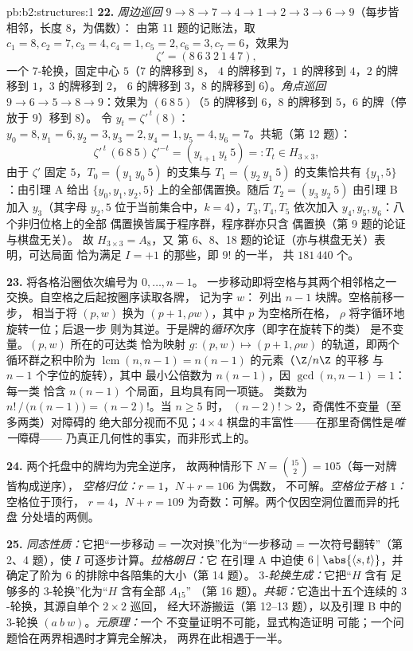 \begin{solution}{pb:b2:structures:1}
\textbf{22.} \emph{周边巡回} $9 \to 8 \to 7 \to 4 \to 1
\to 2 \to 3 \to 6 \to 9$（每步皆相邻，长度 $8$，为偶数）：
由第 11 题的记账法，取 $c_1 = 8, c_2 = 7, c_3 =
4, c_4 = 1, c_5 = 2, c_6 = 3, c_7 = 6$，效果为
\[
\zeta' = (8\ 6\ 3\ 2\ 1\ 4\ 7),
\]
一个 $7$-轮换，固定中心 $5$（$7$ 的牌移到 $8$，
$4$ 的牌移到 $7$，$1$ 的牌移到 $4$，$2$ 的牌移到 $1$，$3$ 的牌移到 $2$，
$6$ 的牌移到 $3$，$8$ 的牌移到 $6$）。\emph{角点巡回} $9 \to 6 \to
5 \to 8 \to 9$：效果为 $(6\ 8\ 5)$（$5$ 的牌移到
$6$，$8$ 的牌移到 $5$，$6$ 的牌（停放于 $9$）移到 $8$）。
令 $y_t = \zeta'^{\,t}(8)$：$y_0 = 8, y_1 = 6, y_2 = 3, y_3 = 2,
y_4 = 1, y_5 = 4, y_6 = 7$。共轭（第 12 题）：
\[
\zeta'^{\,t}\,(6\ 8\ 5)\,\zeta'^{-t}
= (y_{t+1}\ y_t\ 5) =: T_t \in H_{3\times3},
\]
由于 $\zeta'$ 固定 $5$，$T_0 = (y_1\ y_0\ 5)$ 的支集与
$T_1 = (y_2\ y_1\ 5)$ 的支集恰共有 $\{y_1, 5\}$：由引理 A
给出 $\{y_0, y_1, y_2, 5\}$ 上的全部偶置换。随后
$T_2 = (y_3\ y_2\ 5)$ 由引理 B 加入 $y_3$（其字母
$y_2, 5$ 位于当前集合中，$k = 4$），$T_3, T_4, T_5$
依次加入 $y_4, y_5, y_6$：八个非归位格上的全部
偶置换皆属于程序群，程序群亦只含
偶置换（第 9 题的论证与棋盘无关）。
故 $H_{3\times3} = A_8$，又
第 6、8、18 题的论证（亦与棋盘无关）表明，可达局面
恰为满足 $I = +1$ 的那些，即 $9!$ 的一半，
共 $181\,440$ 个。

\textbf{23.} 将各格沿圈依次编号为 $0, \dots, n-1$。
一步移动即将空格与其两个相邻格之一交换。自空格之后起按圈序读取各牌，
记为字 $w$：
列出 $n - 1$ 块牌。空格前移一步，
相当于将 $(p, w)$ 换为 $(p + 1, \rho w)$，其中 $p$ 为空格所在格，
$\rho$ 将字循环地旋转一位；后退一步
则为其逆。于是牌的\emph{循环}次序（即字在旋转下的类）
是不变量。$(p, w)$ 所在的可达类
恰为映射 $g \colon (p, w) \mapsto (p+1,
\rho w)$ 的轨道，即两个循环群之积中阶为 $\operatorname{lcm}(n, n-1) =
n(n-1)$ 的元素（$\Z/n\Z$ 的平移
与 $n-1$ 个字位的旋转），其中
最小公倍数为 $n(n-1)$，因 $\gcd(n, n-1) = 1$：每一类
恰含 $n(n-1)$ 个局面，且均具有同一项链。
类数为 $n!\,/\,\bigl(n(n-1)\bigr) = (n-2)!$。当 $n \geq 5$ 时，
$(n-2)! > 2$，奇偶性不变量（至多两类）对障碍的
绝大部分视而不见；$4
\times 4$ 棋盘的丰富性——在那里奇偶性是\emph{唯一}障碍——
乃真正几何性的事实，而非形式上的。

\textbf{24.} 两个托盘中的牌均为完全逆序，
故两种情形下 $N = \binom{15}{2} = 105$（每一对牌皆构成逆序），
\emph{空格归位：}$r = 1$，$N + r = 106$ 为偶数，
不可解。\emph{空格位于格 $1$：}空格位于顶行，
$r = 4$，$N + r = 109$ 为奇数：可解。两个仅因空洞位置而异的托盘
分处墙的两侧。

\textbf{25.} \emph{同态性质：}它把“一步移动 =
一次对换”化为“一步移动 = 一次符号翻转”（第
2、4 题），使 $I$ 可逐步计算。\emph{拉格朗日：}它
在引理 A 中迫使 $6 \mid \abs{\langle s, t\rangle}$，并
确定了阶为 $6$ 的排除中各陪集的大小（第 14 题）。
\emph{$3$-轮换生成：}它把“$H$ 含有
足够多的 $3$-轮换”化为“$H$ 含有全部 $A_{15}$”
（第 16 题）。\emph{共轭：}它造出十五个连续的
$3$-轮换，其源自单个 $2 \times 2$ 巡回，
经大环游搬运（第 12--13 题），以及引理 B 中的
$3$-轮换 $(a\ b\ w)$。\emph{元原理：}一个
不变量证明不可能，显式构造证明
可能；一个问题恰在两界相遇时才算完全解决，
两界在此相遇于一半。
\end{solution}
